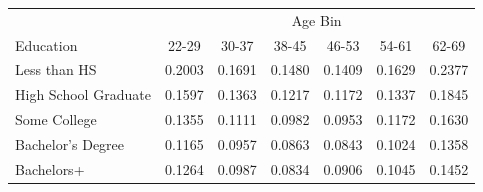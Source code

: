 \begin{tabular}{lcccccc}
\hline\hline
 & \multicolumn{6}{c}{Age Bin} \\
Education & 22-29 & 30-37 & 38-45 & 46-53 & 54-61 & 62-69 \\
\hline
Less than HS&0.2003&0.1691&0.1480&0.1409&0.1629&0.2377\\
High School Graduate&0.1597&0.1363&0.1217&0.1172&0.1337&0.1845\\
Some College&0.1355&0.1111&0.0982&0.0953&0.1172&0.1630\\
Bachelor's Degree&0.1165&0.0957&0.0863&0.0843&0.1024&0.1358\\
Bachelors+&0.1264&0.0987&0.0834&0.0906&0.1045&0.1452\\
\hline\hline
\end{tabular}
